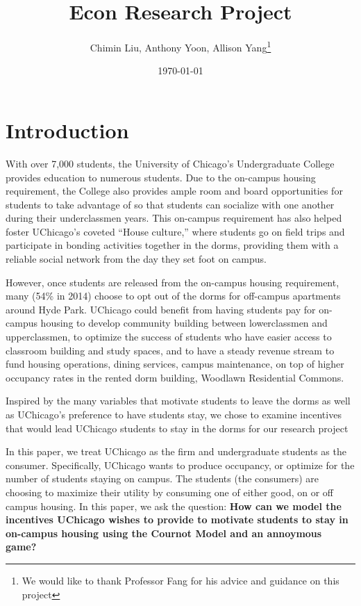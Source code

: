 \documentclass[12pt]{article}
\title{Econ Research Project}
\author{Chimin Liu, Anthony Yoon, Allison Yang\thanks{We would like to thank Professor Fang for his advice and guidance on this project}}
\date{\today}
\begin{document}
\maketitle
\tableofcontents
\newpage
\section{Introduction}
With over 7,000 students, the University of Chicago’s Undergraduate College provides education to numerous students. Due to the on-campus housing requirement, the College also provides ample room and board opportunities for students to take advantage of so that students can socialize with one another during their underclassmen years. This on-campus requirement has also helped foster UChicago’s coveted “House culture,” where students go on field trips and participate in bonding activities together in the dorms, providing them with a reliable social network from the day they set foot on campus.


However, once students are released from the on-campus housing requirement, many (54\% in 2014) choose to opt out of the dorms for off-campus apartments around Hyde Park. UChicago could benefit from having students pay for on-campus housing to develop community building between lowerclassmen and upperclassmen, to optimize the success of students who have easier access to classroom building and study spaces, and to have a steady revenue stream to fund housing operations, dining services, campus maintenance, on top of higher occupancy rates in the rented dorm building, Woodlawn Residential Commons. 


Inspired by the many variables that motivate students to leave the dorms as well as UChicago’s preference to have students stay, we chose to examine incentives that would lead UChicago students to stay in the dorms for our research project


In this paper, we treat UChicago as the firm and undergraduate students as the consumer. Specifically, UChicago wants to produce occupancy, or optimize for the number of students staying on campus. The students (the consumers) are choosing to maximize their utility by consuming one of either good, on or off campus housing. In this paper, we ask the question: \textbf{How can we model the incentives UChicago wishes to provide to motivate students to stay in on-campus housing using the Cournot Model and an annoymous game?}
\end{document}
